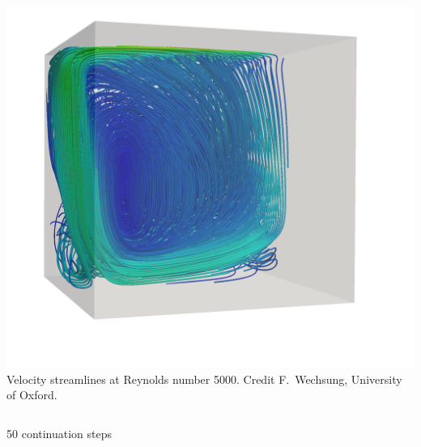 \documentclass[presentation,aspectratio=43, 10pt]{beamer}
\begin{document}
\begin{frame}[t]
\begin{columns}
\begin{column}{0.5\textwidth}
{        \includegraphics[width=\textwidth]{LDC-streamlines}}
      {\scriptsize Velocity streamlines at Reynolds number 5000.
        Credit F.~Wechsung, University of Oxford.}
    \end{column}
  \end{columns}
  \begin{center}
    50 continuation steps
  \end{center}
\end{frame}
\end{document}
